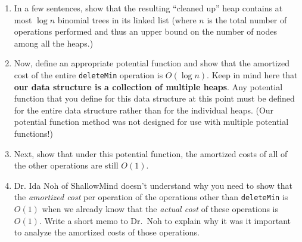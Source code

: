 \documentclass[12 pt, letterpaper]{hmcpset}
\begin{document}
\begin{problem}
\begin{enumerate}
  \item In a few sentences, show that the resulting ``cleaned up'' heap contains at most $\log n$ binomial trees in its linked list (where $n$ is the total number of operations performed and thus an upper bound on the number of nodes among all the heaps.)

  \item Now, define an appropriate potential function and show that the
amortized cost of the entire \verb+deleteMin+ operation is $O(\log n)$. Keep in
mind here that \textbf{our data structure is a collection of multiple heaps}.  Any
potential function that you define for this data structure at this point must be
defined for the entire data structure rather than for the individual heaps.
(Our potential function method was not designed for use with multiple potential
functions!)
	
  \item Next, show that under this potential function, the amortized costs of
all of the other operations are still $O(1)$.
	
  \item Dr. Ida Noh of ShallowMind doesn't understand why you need to show that
the \emph{amortized cost} per operation of the operations other than
\verb+deleteMin+ is $O(1)$ when we already know that the \emph{actual cost} of
these operations is $O(1)$.  Write a short memo to Dr.~Noh to explain why it
was it important to analyze the amortized costs of those operations.
\end{enumerate}

\end{problem}
\end{document}
